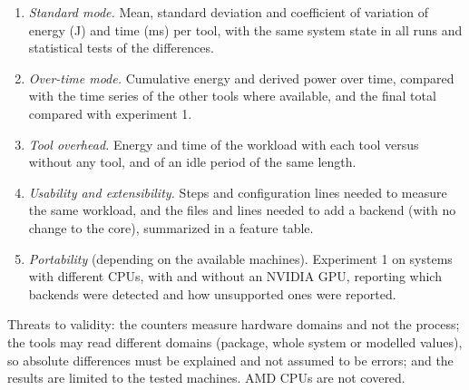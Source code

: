 \begin{enumerate}
    \item \textit{Standard mode.} Mean, standard deviation and coefficient of variation of energy (J) and time (ms) per tool, with the same system state in all runs and statistical tests of the differences.
    \item \textit{Over-time mode.} Cumulative energy and derived power over time, compared with the time series of the other tools where available, and the final total compared with experiment 1.
    \item \textit{Tool overhead.} Energy and time of the workload with each tool versus without any tool, and of an idle period of the same length.
    \item \textit{Usability and extensibility.} Steps and configuration lines needed to measure the same workload, and the files and lines needed to add a backend (with no change to the core), summarized in a feature table.
    \item \textit{Portability} (depending on the available machines). Experiment 1 on systems with different CPUs, with and without an NVIDIA GPU, reporting which backends were detected and how unsupported ones were reported.
\end{enumerate}

Threats to validity: the counters measure hardware domains and not the process; the tools may read different domains (package, whole system or modelled values), so absolute differences must be explained and not assumed to be errors; and the results are limited to the tested machines. AMD CPUs are not covered.

